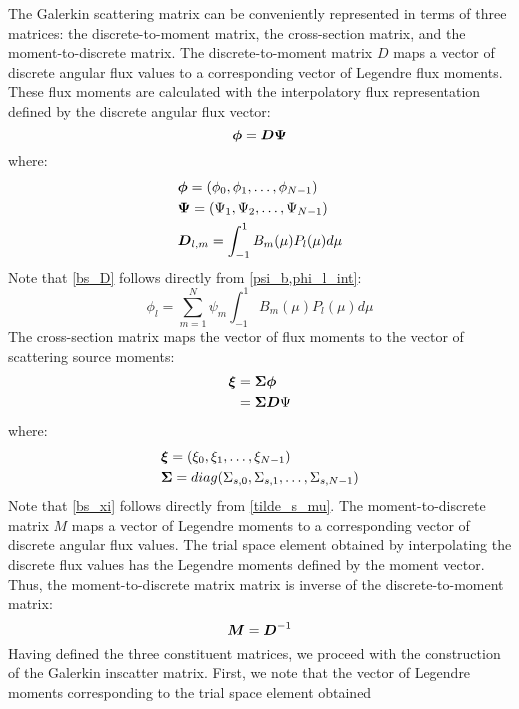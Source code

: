 The Galerkin scattering matrix can be conveniently represented in terms of
three matrices: the discrete-to-moment matrix, the cross-section matrix, and
the moment-to-discrete matrix. The discrete-to-moment matrix $D$ maps a vector
of discrete angular flux values to a corresponding vector of Legendre flux
moments. These flux moments are calculated with the interpolatory flux
representation defined by the discrete angular flux vector:
\begin{equation}
\boldsymbol{\phi} = \boldsymbol{D\Psi}
\end{equation}
where:
\begin{align}
&\bs{\phi} = (\phi_0,\phi_1,\hdots,\phi_{N-1})\\
&\bs{\Psi} = (\Psi_1,\Psi_2,\hdots,\Psi_{N-1})\\
&\bs{D}_{l,m} = \int_{-1}^1 B_m(\mu) P_l(\mu)d\mu \label{bs_D}
\end{align}
Note that \cref{bs_D} follows directly from \cref{psi_b,phi_l_int}:
\begin{equation}
\phi_l = \sum_{m=1}^{N} \psi_m \int_{-1}^1 B_m(\mu) P_l(\mu)d\mu
\end{equation}
The cross-section matrix maps the vector of flux moments to the vector of
scattering source moments:
\begin{equation}
\begin{split}
\bs{\xi} &= \bs{\Sigma \phi}\\
&= \bs{\Sigma D}\Psi
\label{bs_xi}
\end{split}
\end{equation}
where:
\begin{align}
&\bs{\xi} = (\xi_0,\xi_1,\hdots,\xi_{N-1})\\
&\bs{\Sigma} = diag(\Sigma_{s,0},\Sigma_{s,1},\hdots,\Sigma_{s,N-1})
\label{bs_sigma}
\end{align}
Note that \cref{bs_xi} follows directly from \cref{tilde_s_mu}. The 
moment-to-discrete matrix $M$ maps a vector of
Legendre moments to a corresponding vector of discrete angular flux values.
The trial space element obtained by interpolating the discrete flux values has
the Legendre moments defined by the moment vector. Thus, the
moment-to-discrete matrix matrix is inverse of the discrete-to-moment matrix:
\begin{equation}
\boldsymbol{M} = \boldsymbol{D}^{-1}
\end{equation}
Having defined the three constituent matrices, we proceed with the
construction of the Galerkin inscatter matrix. First, we note that the
vector of Legendre moments corresponding to the trial space element obtained
